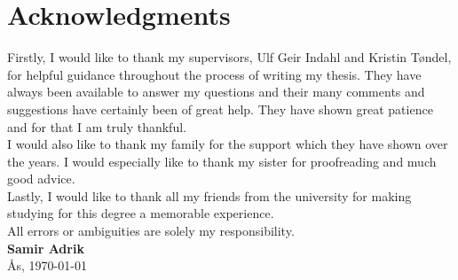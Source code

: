 \documentclass[../thesis.tex]{subfiles}
\begin{document}
\chapter*{Acknowledgments}

\noindent Firstly, I would like to thank my supervisors, Ulf Geir Indahl and Kristin Tøndel, for helpful guidance throughout the process of writing my thesis. They have always been available to answer my questions and their many comments and suggestions have certainly been of great help. They have shown great patience and for that I am truly thankful.\\

\noindent I would also like to thank my family for the support which they have shown over the years. I would especially like to thank my sister for proofreading and much good advice.\\

\noindent Lastly, I would like to thank all my friends from the university for making studying for this degree a memorable experience. \\

\noindent All errors or ambiguities are solely my responsibility.\\

\noindent \textbf{Samir Adrik}\\
Ås, \today

\newpage{\pagestyle{empty}\cleardoublepage}
\end{document}
